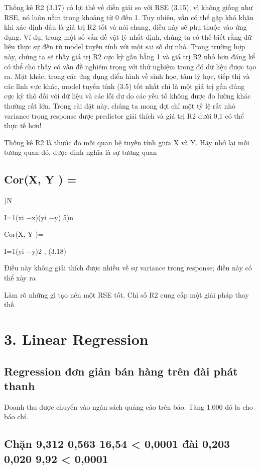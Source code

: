 Thống kê R2 (3.17) có lợi thế về diễn giải so với RSE (3.15), vì không giống như RSE, nó luôn nằm trong khoảng từ 0 đến 1. Tuy nhiên, vẫn có thể gặp khó khăn khi xác định đâu là giá trị R2 tốt và nói chung, điều này sẽ phụ thuộc vào ứng dụng. Ví dụ, trong một số vấn đề vật lý nhất định, chúng ta có thể biết rằng dữ liệu thực sự đến từ model tuyến tính với một sai số dư nhỏ. Trong trường hợp này, chúng ta sẽ thấy giá trị R2 cực kỳ gần bằng 1 và giá trị R2 nhỏ hơn đáng kể có thể cho thấy có vấn đề nghiêm trọng với thử nghiệm trong đó dữ liệu được tạo ra. Mặt khác, trong các ứng dụng điển hình về sinh học, tâm lý học, tiếp thị và các lĩnh vực khác, model tuyến tính (3.5) tốt nhất chỉ là một giá trị gần đúng cực kỳ thô đối với dữ liệu và các lỗi dư do các yếu tố không được đo lường khác thường rất lớn. Trong cài đặt này, chúng ta mong đợi chỉ một tỷ lệ rất nhỏ variance trong response được predictor giải thích và giá trị R2 dưới 0,1 có thể thực tế hơn!

Thống kê R2 là thước đo mối quan hệ tuyến tính giữa X và Y. Hãy nhớ lại mối tương quan đó, được định nghĩa là sự tương quan

\subsection{Cor(X, Y ) =}

)N

I=1(xi −x)(yi −y) 5)n

Cor(X, Y )=

I=1(yi −y)2 , (3.18)

Điều này không giải thích được nhiều về sự variance trong response; điều này có thể xảy ra

Làm rõ những gì tạo nên một RSE tốt. Chỉ số R2 cung cấp một giải pháp thay thế.

\section{3. Linear Regression}

\subsection{Regression đơn giản bán hàng trên đài phát thanh}

Doanh thu được chuyển vào ngân sách quảng cáo trên báo. Tăng 1.000 đô la cho báo chí.

\subsection{Chặn 9,312 0,563 16,54 < 0,0001 đài 0,203 0,020 9,92 < 0,0001}

